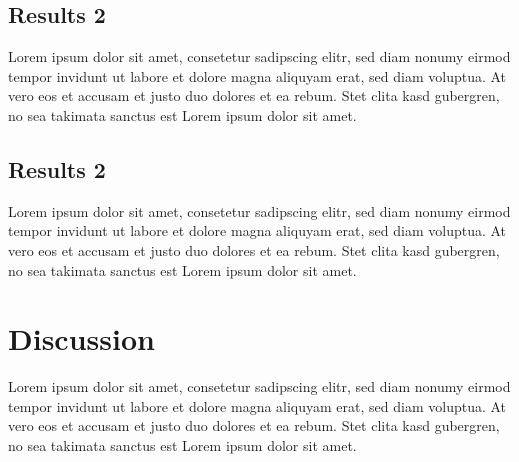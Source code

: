 \subsection{Results 2}

Lorem ipsum dolor sit amet, consetetur sadipscing elitr, sed diam nonumy eirmod
tempor invidunt ut labore et dolore magna aliquyam erat, sed diam voluptua. At
vero eos et accusam et justo duo dolores et ea rebum. Stet clita kasd gubergren,
no sea takimata sanctus est Lorem ipsum dolor sit amet.

\subsection{Results 2}

Lorem ipsum dolor sit amet, consetetur sadipscing elitr, sed diam nonumy eirmod
tempor invidunt ut labore et dolore magna aliquyam erat, sed diam voluptua. At
vero eos et accusam et justo duo dolores et ea rebum. Stet clita kasd gubergren,
no sea takimata sanctus est Lorem ipsum dolor sit amet.

\section{Discussion}

Lorem ipsum dolor sit amet, consetetur sadipscing elitr, sed diam nonumy eirmod
tempor invidunt ut labore et dolore magna aliquyam erat, sed diam voluptua. At
vero eos et accusam et justo duo dolores et ea rebum. Stet clita kasd gubergren,
no sea takimata sanctus est Lorem ipsum dolor sit amet.
